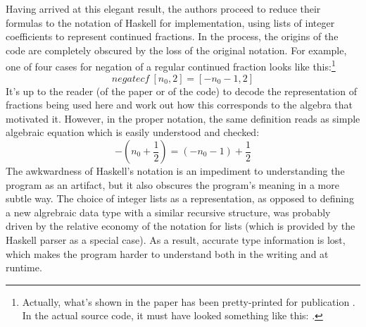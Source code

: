 Having arrived at this elegant result, the authors proceed to reduce their formulas to the notation of Haskell for implementation, using lists of integer coefficients to represent continued fractions. In the process, the origins of the code are completely obscured by the loss of the original notation. For example, one of four cases for negation of a regular continued fraction looks like this:\footnote{Actually, what's shown in the paper has been pretty-printed for publication \cite{lhs2tex}. In the actual source code, it must have looked something like this: .}
$$\mathit{negatecf}\:[n_0, 2] = [-n_0-1, 2]$$
It's up to the reader (of the paper or of the code) to decode the representation of fractions being used here and work out how this corresponds to the algebra that motivated it. However, in the proper notation, the same definition reads as simple algebraic equation which is easily understood and checked:
$$-\left(n_0 + \frac{1}{2}\right) = (-n_0 - 1) + \frac{1}{2}$$
The awkwardness of Haskell's notation is an impediment to understanding the program as an artifact, but it also obscures the program's meaning in a more subtle way. The choice of integer lists as a representation, as opposed to defining a new algrebraic data type with a similar recursive structure, was probably driven by the relative economy of the notation for lists (which is provided by the Haskell parser as a special case). As a result, accurate type information is lost, which makes the program harder to understand both in the writing and at runtime.


